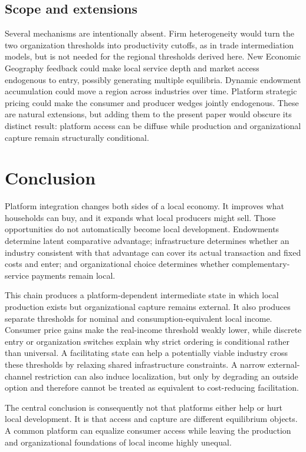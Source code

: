 \documentclass[11pt]{article}
\theoremstyle{definition}
\theoremstyle{remark}
\begin{document}
\subsection{Scope and extensions}

Several mechanisms are intentionally absent.  Firm heterogeneity would turn
the two organization thresholds into productivity cutoffs, as in trade
intermediation models, but is not needed for the regional thresholds derived
here.  New Economic Geography feedback could make local service depth and
market access endogenous to entry, possibly generating multiple equilibria.
Dynamic endowment accumulation could move a region across industries over
time.  Platform strategic pricing could make the consumer and producer wedges
jointly endogenous.  These are natural extensions, but adding them to the
present paper would obscure its distinct result: platform access can be
diffuse while production and organizational capture remain structurally
conditional.

\section{Conclusion}

Platform integration changes both sides of a local economy.  It improves what
households can buy, and it expands what local producers might sell.  Those
opportunities do not automatically become local development.  Endowments
determine latent comparative advantage; infrastructure determines whether
an industry consistent with that advantage can cover its actual transaction
and fixed costs and enter; and organizational choice determines whether
complementary-service payments remain local.

This chain produces a platform-dependent intermediate state in which local
production exists but organizational capture remains external.  It also
produces separate thresholds for nominal and consumption-equivalent local
income.  Consumer price gains make the real-income threshold weakly lower,
while discrete entry or organization switches explain why strict ordering is
conditional rather than universal.  A facilitating state can help a
potentially viable industry cross these thresholds by relaxing shared
infrastructure constraints.  A narrow external-channel restriction
can also induce localization, but only by degrading an outside option and
therefore cannot be treated as equivalent to cost-reducing facilitation.

The central conclusion is consequently not that platforms either help or
hurt local development.  It is that access and capture are different
equilibrium objects.  A common platform can equalize consumer access while
leaving the production and organizational foundations of local income highly
unequal.

\clearpage



\clearpage
\appendix

\end{document}
